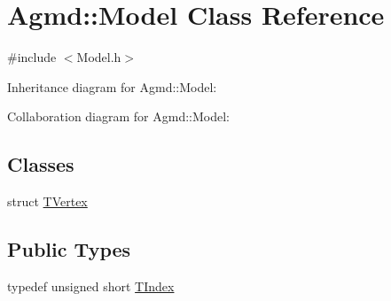 \hypertarget{class_agmd_1_1_model}{\section{Agmd\+:\+:Model Class Reference}
\label{class_agmd_1_1_model}
}


{\ttfamily \#include $<$Model.\+h$>$}



Inheritance diagram for Agmd\+:\+:Model\+:


Collaboration diagram for Agmd\+:\+:Model\+:
\subsection*{Classes}
\begin{DoxyCompactItemize}
\item 
struct \hyperlink{struct_agmd_1_1_model_1_1_t_vertex}{T\+Vertex}
\end{DoxyCompactItemize}
\subsection*{Public Types}
\begin{DoxyCompactItemize}
\item 
typedef unsigned short \hyperlink{class_agmd_1_1_model_aca4a6ee5402b386a0b9d0aea52c71eaa}{T\+Index}
\end{DoxyCompactItemize}
